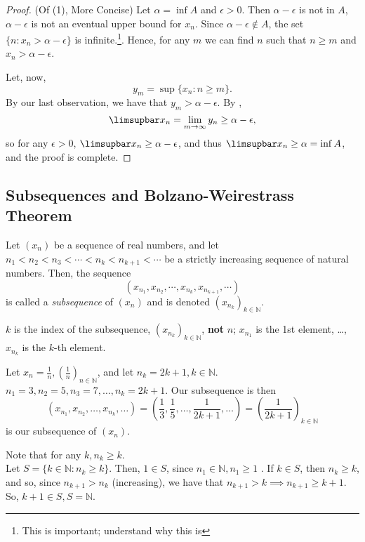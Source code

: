 \documentclass[12pt]{article}
\begin{document}
\begin{proof}(Of (1), More Concise)
  Let $\alpha = \inf A$ and $\epsilon > 0$. Then $\alpha - \epsilon$ is not in $A$, $\alpha - \epsilon$ is not an eventual upper bound for $x_n$. Since $\alpha - \epsilon \not\in A$, the set $\{n : x_n > \alpha - \epsilon\}$ is infinite.\footnote{This is important; understand why this is}. Hence, for any $m$ we can find $n$ such that $n \geq m$ and $x_n > \alpha - \epsilon$.

  Let, now, $$y_m = \sup \{x_n : n \geq m\}.$$ By our last observation, we have that $y_m > \alpha - \epsilon$. By , \[
  \limsupbar x_n = \lim_{m\to\infty} y_n \geq \alpha - \epsilon,
  \]
  so for any $\epsilon > 0$, $\limsupbar x_n \geq \alpha - \epsilon$, and thus $\limsupbar x_n \geq \alpha = \inf A$, and the proof is complete.
\end{proof}

\subsection{Subsequences and Bolzano-Weirestrass Theorem}

\begin{definition}[Subsequence]
  Let $(x_n)$ be a sequence of real numbers, and let $n_1 < n_2 < n_3 <\cdots < n_k < n_{k+1} < \cdots$ be a strictly increasing sequence of natural numbers. Then, the sequence \[(x_{n_1}, x_{n_2}, \cdots, x_{n_k}, x_{n_{k+1}} , \cdots )\] is called a \emph{subsequence} of $(x_n)$ and is denoted $(x_{n_k})_{k \in \mathbb{N}}$.
\end{definition}

\begin{remark}
  $k$ is the index of the subsequence, $(x_{n_k})_{k\in\mathbb{N}}$, \textbf{not} $n$; $x_{n_1}$ is the 1st element, \dots, $x_{n_k}$ is the $k$-th element.
\end{remark}

\begin{example}
  Let $x_{n} = \frac{1}{n}, (\frac{1}{n})_{n\in\mathbb{N}}$, and let $n_k = 2k+1, k \in \mathbb{N}$. $n_1 =3, n_2 = 5, n_3 = 7, \dots, n_k = 2k+1$. Our subsequence is then \[(x_{n_1}, x_{n_2}, \dots, x_{n_k}, \dots) = \left(\frac{1}{3}, \frac{1}{5}, \dots, \frac{1}{2k+1}, \dots\right) = \left(\frac{1}{2k+1}\right)_{k\in\mathbb{N}}\]is our subsequence of $(x_n)$.
\end{example}

\begin{remark}\label{remark:nkgeqk}
  Note that for any $k, n_{k} \geq k$.\\ Let $S = \{k \in \mathbb{N} : n_k \geq k\}$. Then, $1 \in S$, since $n_1 \in \mathbb{N}, n_1 \geq 1$ . If $k \in S$, then $n_k \geq k$, and so, since $n_{k+1} > n_k$ (increasing), we have that $n_{k+1}> k \implies n_{k+1} \geq k+1$. So, $k+1 \in S, S= \mathbb{N}$.
\end{remark}
\end{document}
